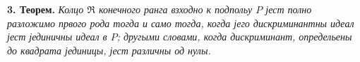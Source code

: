 \documentclass[11pt]{article}
\begin{document}
\setcounter{footnote}{27}

\textbf{3. Теорем.} \emph{Колцо $\mathfrak R$ конечного ранга взходно к подпольу $P$ јест полно разложимо првого рода тогда и само тогда, когда јего дискриминантны идеал јест јединичны идеал в $P$; другыми словами, когда дискриминант, определьены до квадрата јединицы, јест различны од нулы.}
\end{document}
